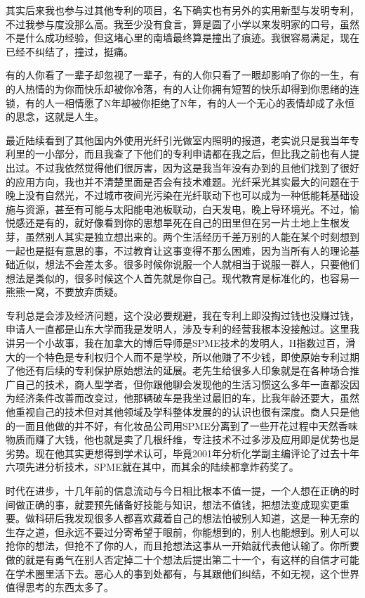 \documentclass[]{book}
\begin{document}
其实后来我也参与过其他专利的项目，名下确实也有另外的实用新型与发明专利，不过我参与度没那么高。我至少没有食言，算是圆了小学以来发明家的口号，虽然不是什么成功经验，但这堵心里的南墙最终算是撞出了痕迹。我很容易满足，现在已经不纠结了，撞过，挺痛。

有的人你看了一辈子却忽视了一辈子，有的人你只看了一眼却影响了你的一生，有的人热情的为你而快乐却被你冷落，有的人让你拥有短暂的快乐却得到你思绪的连锁，有的人一相情愿了N年却被你拒绝了N年，有的人一个无心的表情却成了永恒的思念，这就是人生。

最近陆续看到了其他国内外使用光纤引光做室内照明的报道，老实说只是我当年专利里的一小部分，而且我查了下他们的专利申请都在我之后，但比我之前也有人提出过。不过我依然觉得他们很厉害，因为这是我当年没有办到的且他们找到了很好的应用方向，我也并不清楚里面是否会有技术难题。光纤采光其实最大的问题在于晚上没有自然光，不过城市夜间光污染在光纤联动下也可以成为一种低能耗基础设施与资源，甚至有可能与太阳能电池板联动，白天发电，晚上导环境光。不过，愉悦感还是有的，就好像看到你的思想旱死在自己的田里但在另一片土地上生根发芽，虽然别人其实是独立想出来的。两个生活经历千差万别的人能在某个时刻想到一起也是挺有意思的事，不过教育让这事变得不那么困难，因为当所有人的理论基础近似，想法不会差太多。很多时候你说服一个人就相当于说服一群人，只要他们想法是类似的，很多时候这个人首先就是你自己。现代教育是标准化的，也容易一熊熊一窝，不要放弃质疑。

专利总是会涉及经济问题，这个没必要规避，我在专利上即没掏过钱也没赚过钱，申请人一直都是山东大学而我是发明人，涉及专利的经营我根本没接触过。这里我讲另一个小故事，我在加拿大的博后导师是SPME技术的发明人，H指数过百，滑大的一个特色是专利权归个人而不是学校，所以他赚了不少钱，即使原始专利过期了他还有后续的专利保护原始想法的延展。老先生给很多人印象就是在各种场合推广自己的技术，商人型学者，但你跟他聊会发现他的生活习惯这么多年一直都没因为经济条件改善而改变过，他那辆破车是我坐过最旧的车，比我年龄还要大，虽然他重视自己的技术但对其他领域及学科整体发展的的认识也很有深度。商人只是他的一面且他做的并不好，有化妆品公司用SPME分离到了一些开花过程中天然香味物质而赚了大钱，他也就是卖了几根纤维，专注技术不过多涉及应用即是优势也是劣势。现在他其实更想得到学术认可，毕竟2001年分析化学副主编评论了过去十年六项先进分析技术，SPME就在其中，而其余的陆续都拿炸药奖了。

时代在进步，十几年前的信息流动与今日相比根本不值一提，一个人想在正确的时间做正确的事，就要预先储备好技能与知识，想法不值钱，把想法变成现实更重要。做科研后我发现很多人都喜欢藏着自己的想法怕被别人知道，这是一种无奈的生存之道，但永远不要过分寄希望于眼前，你能想到的，别人也能想到。别人可以抢你的想法，但抢不了你的人，而且抢想法这事从一开始就代表他认输了。你所要做的就是有勇气在别人否定掉二十个想法后提出第二十一个，有这样的自信才可能在学术圈里活下去。恶心人的事到处都有，与其跟他们纠结，不如无视，这个世界值得思考的东西太多了。
\end{document}
